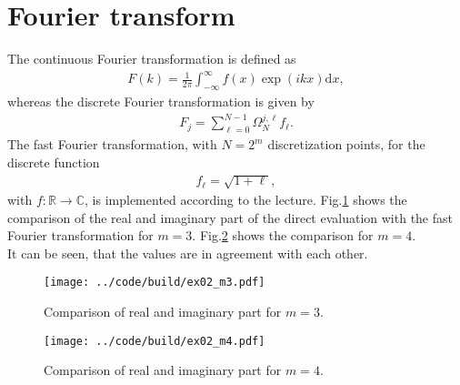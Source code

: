 \section{Fourier transform}
The continuous Fourier transformation is defined as 
\begin{align}
    F(k) = \frac{1}{2 \pi} \int_{-\infty}^{\infty} f(x) \exp (ikx) \text{d}x,
\end{align}
whereas the discrete Fourier transformation is given by
\begin{align}
    F_j = \sum_{\ell=0}^{N-1} \Omega_N^{j,\ell} f_\ell.
\end{align}
The fast Fourier transformation, with $N=2^m$ discretization points, for the discrete function
\begin{align}
    f_{\ell} = \sqrt{1 +\ell},
\end{align}
with $f: \mathbb{R} \rightarrow \mathbb{C}$, is implemented according to the lecture. Fig.\ref{fig:ex02_m3} shows the comparison of the real and imaginary part of the direct evaluation with the fast Fourier transformation for $m=3$. Fig.\ref{fig:ex02_m4} shows the comparison for $m=4$.\\
It can be seen, that the values are in agreement with each other.

\begin{figure}[h]
    \centering
    \texttt{[image: ../code/build/ex02\_m3.pdf]}
    \caption{Comparison of real and imaginary part for $m=3$. }
    \label{fig:ex02_m3}
\end{figure}

\begin{figure}[h]
    \centering
    \texttt{[image: ../code/build/ex02\_m4.pdf]}
    \caption{Comparison of real and imaginary part for $m=4$. }
    \label{fig:ex02_m4}
\end{figure}
